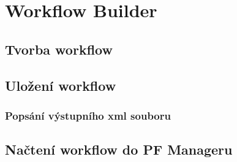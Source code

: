 \newpage
\chapter{Workflow Builder}

\section{Tvorba workflow}
\section{Uložení workflow}
\subsection{Popsání výstupního xml souboru}
\section{Načtení workflow do PF Manageru}
